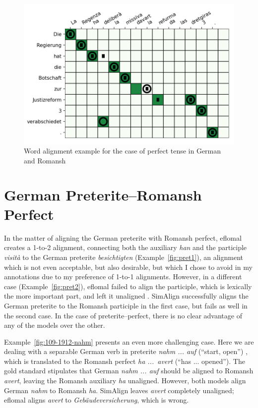 \begin{figure}
\includegraphics{graphics/alignments/example1.png}
\caption{Word alignment example for the case of perfect tense in German and Romansh}\label{fig:die-regierung}
\end{figure}





\section{German Preterite--Romansh Perfect}

In the matter of aligning the German preterite with Romansh perfect, eflomal creates a 1-to-2 alignment, connecting both the auxiliary \emph{han} and the participle \emph{visità} to the German preterite \emph{besichtigten} (Example~\ref{fig:pret1}), an alignment which is not even acceptable, but also desirable, but which I chose to avoid in my annotations due to my preference of 1-to-1 alignments. However, in a different case (Example~\ref{fig:pret2}), eflomal failed to align the participle, which is lexically the more important part, and left it unaligned . 
SimAlign successfully aligns the German preterite to the Romansh participle in the first case, but fails as well in the second case.
In the case of preterite--perfect, there is no clear advantage of any of the models over the other.

Example~\ref{fig:109-1912-nahm} presents an even more challenging case. 
Here we are dealing with a separable German verb in preterite \emph{nahm ... 
auf} (\enquote{start, open}) , which is translated to the Romansh perfect \emph{ha ...~avert} (\enquote{has ... 
opened}). 
The gold standard stipulates that German \emph{nahm ... 
auf} should be aligned to Romansh \emph{avert}, leaving the Romansh auxiliary \emph{ha} unaligned. 
However, both models align German \emph{nahm} to Romansh \emph{ha}. SimAlign leaves \emph{avert} completely unaligned; eflomal aligns \emph{avert} to \emph{Gebäudeversicherung}, which is wrong.

